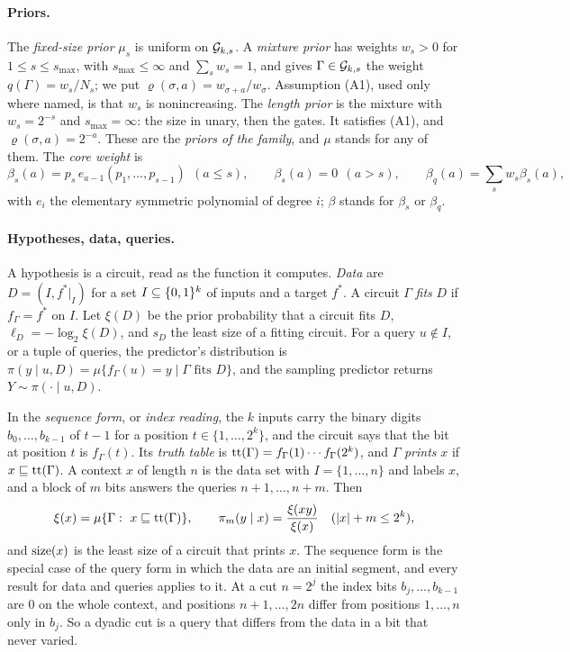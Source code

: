 \paragraph{Priors.} The \emph{fixed-size prior} $\mu_s$ is uniform on $\mathcal G_{k,s}$. A \emph{mixture prior} has
weights $w_s>0$ for $1\le s\le s_{\max}$, with $s_{\max}\le\infty$ and $\sum_sw_s=1$, and gives
$\Gamma\in\mathcal G_{k,s}$ the weight $q(\Gamma)=w_s/N_s$; we put $\varrho(\sigma,a)=w_{\sigma+a}/w_\sigma$.
Assumption (A1), used only where named, is that $w_s$ is nonincreasing. The \emph{length prior} is the mixture
with $w_s=2^{-s}$ and $s_{\max}=\infty$: the size in unary, then the gates. It satisfies (A1), and
$\varrho(\sigma,a)=2^{-a}$. These are the \emph{priors of the family}, and $\mu$ stands for any of them. The
\emph{core weight} is
\[
\beta_s(a)=p_s\,e_{a-1}(p_1,\dots,p_{s-1})\ \ (a\le s),\qquad\beta_s(a)=0\ \ (a>s),\qquad
\beta_q(a)=\sum_sw_s\beta_s(a),
\]
with $e_i$ the elementary symmetric polynomial of degree $i$; $\beta$ stands for $\beta_s$ or $\beta_q$.

\paragraph{Hypotheses, data, queries.} A hypothesis is a circuit, read as the function it computes.
\emph{Data} are $D=(I,f^*|_I)$ for a set $I\subseteq\{0,1\}^k$ of inputs and a target $f^*$. A circuit $\Gamma$
\emph{fits} $D$ if $f_\Gamma=f^*$ on $I$. Let $\xi(D)$ be the prior probability that a circuit fits $D$,
$\ell_D=-\log_2\xi(D)$, and $s_D$ the least size of a fitting circuit. For a query $u\notin I$, or a tuple of
queries, the predictor's distribution is $\pi(y\mid u,D)=\mu\{f_\Gamma(u)=y\mid\Gamma\text{ fits }D\}$, and
the sampling predictor returns $Y\sim\pi(\cdot\mid u,D)$.

In the \emph{sequence form}, or \emph{index reading}, the $k$ inputs carry the binary digits
$b_0,\dots,b_{k-1}$ of $t-1$ for a position $t\in\{1,\dots,2^k\}$, and the circuit says that the bit at
position $t$ is $f_\Gamma(t)$. Its \emph{truth table} is $\mathrm{tt}(\Gamma)=f_\Gamma(1)\cdots f_\Gamma(2^k)$, and
$\Gamma$ \emph{prints} $x$ if $x\sqsubseteq\mathrm{tt}(\Gamma)$. A context $x$ of length $n$ is the data set with
$I=\{1,\dots,n\}$ and labels $x$, and a block of $m$ bits answers the queries $n+1,\dots,n+m$. Then
\[
\xi(x)=\mu\{\Gamma:\ x\pre\ctt(\Gamma)\},\qquad\pi_m(y\mid x)=\frac{\xi(xy)}{\xi(x)}\quad(|x|+m\le2^k),
\]
and $\mathrm{size}(x)$ is the least size of a circuit that prints $x$. The sequence form is the special case of the
query form in which the data are an initial segment, and every result for data and queries applies to it. At a
cut $n=2^j$ the index bits $b_j,\dots,b_{k-1}$ are $0$ on the whole context, and positions $n+1,\dots,2n$
differ from positions $1,\dots,n$ only in $b_j$. So a dyadic cut is a query that differs from the data in a
bit that never varied.

